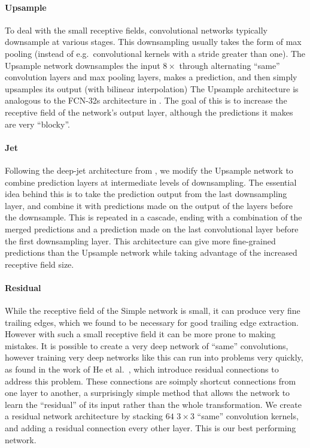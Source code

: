 \paragraph{Upsample}
To deal with the small receptive fields, convolutional networks typically downsample at various stages. 
This downsampling usually takes the form of max pooling (instead of e.g.\ convolutional kernels with a stride greater than one).
The Upsample network downsamples the input $8\times$ through alternating ``same'' convolution layers and max pooling layers, makes a prediction, and then simply upsamples its output (with bilinear interpolation)
The Upsample architecture is analogous to the FCN-32s architecture in \cite{long2015fully}.%
The goal of this is to increase the receptive field of the network's output layer, although the predictions it makes are very ``blocky''.

\paragraph{Jet}
Following the deep-jet architecture from \cite{long2015fully}, we modify the Upsample network to combine prediction layers at intermediate levels of downsampling.
The essential idea behind this is to take the prediction output from the last downsampling layer, and combine it with predictions made on the output of the layers before the downsample.
This is repeated in a cascade, ending with a combination of the merged predictions and a prediction made on the last convolutional layer before the first downsampling layer.
This architecture can give more fine-grained predictions than the Upsample network while taking advantage of the increased receptive field size.

\paragraph{Residual}
While the receptive field of the Simple network is small, it can produce very fine trailing edges, which we found to be necessary for good trailing edge extraction.
However with such a small receptive field it can be more prone to making mistakes.
It is possible to create a very deep network of ``same'' convolutions, however training very deep networks like this can run into problems very quickly, as found in the work of He et al.\ \cite{he2015deep}, which introduce residual connections to address this problem.
These connections are soimply shortcut connections from one layer to another, a surprisingly simple method that allows the network to learn the ``residual'' of its input rather than the whole transformation.
We create a residual network architecture by stacking $64$ $3\times3$ ``same'' convolution kernels, and adding a residual connection every other layer.
This is our best performing network.

